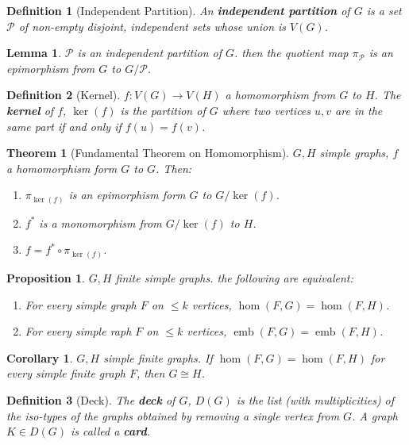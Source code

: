 \documentclass{article}
\newcommand{\tfae}{the following are equivalent}
\DeclareMathOperator*{\emb}{emb}
\newtheorem*{definition}{Definition}
\newtheorem*{proposition}{Proposition}
\newtheorem*{lemma}{Lemma}
\newtheorem*{theorem}{Theorem}
\newtheorem*{corollary}{Corollary}
\begin{document}
\begin{definition}[Independent Partition]
    An \textbf{independent partition} of $ G $ is a set $ \mathcal{P} $ of non-empty disjoint, independent sets whose union is $ V(G) $.
\end{definition}

\begin{lemma}
    $ \mathcal{P} $ is an independent partition of $ G $. then the quotient map $ \pi_\mathcal{P} $ is an epimorphism from $ G $ to
    $ G / \mathcal{P} $.
\end{lemma}

\begin{definition}[Kernel]
    $ f: V(G) \to V(H) $ a homomorphism from $ G $ to $ H $. The \textbf{kernel} of $ f $, $ \ker(f) $ is the partition of $ G $
    where two vertices $ u,v $ are in the same part if and only if $ f(u) = f(v) $.
\end{definition}

\begin{theorem}[Fundamental Theorem on Homomorphism]
    $ G, H $ simple graphs, $ f $ a homomorphism form $ G $ to $ G $. Then:
    \begin{enumerate}
        \item $ \pi_{\ker(f)} $ is an epimorphism form $ G $ to $ G / \ker(f) $.
        \item $ f^* $ is a monomorphism from $ G / \ker(f) $ to $ H $.
        \item $ f = f^* \circ \pi_{\ker(f)} $.
    \end{enumerate}
\end{theorem}

\begin{proposition}
    $ G, H $ finite simple graphs. \tfae:
    \begin{enumerate}
        \item For every simple graph $ F $ on $ \leq k $ vertices, $ \hom(F, G) = \hom(F, H) $.
        \item For every simple raph $ F $ on $ \leq k $ vertices, $ \emb(F, G) = \emb(F, H) $.
    \end{enumerate}
\end{proposition}

\begin{corollary}
    $ G, H $ simple finite graphs. If $ \hom(F,G) = \hom(F, H) $ for every simple finite graph $ F $, then $ G \cong H $.
\end{corollary}

\begin{definition}[Deck]
    The \textbf{deck} of $ G $, $ D(G) $ is the list (with multiplicities) of the iso-types of the graphs obtained by removing a single
    vertex from $ G $. A graph $ K \in D(G) $ is called a \textbf{card}.
\end{definition}
\end{document}
